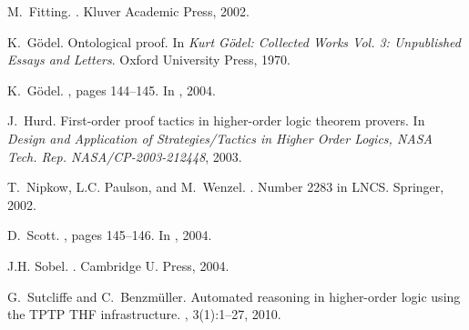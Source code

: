 \documentclass{easychair}
\begin{document}
\begin{thebibliography}{10}
M.~Fitting.
.
\newblock Kluver Academic Press, 2002.

K.~G\"odel.
\newblock Ontological proof.
\newblock In {\em {Kurt G\"odel: Collected Works Vol. 3: Unpublished Essays and
  Letters}}. Oxford University Press, 1970.

K.~G\"odel.
, pages 144--145.
\newblock In  \cite{sobel2004logic}, 2004.


J.~Hurd.
\newblock First-order proof tactics in higher-order logic theorem provers.
\newblock In {\em Design and Application of Strategies/Tactics in Higher Order
  Logics, NASA Tech. Rep. NASA/CP-2003-212448}, 2003.

T.~Nipkow, L.C. Paulson, and M.~Wenzel.
.
\newblock Number 2283 in LNCS. Springer, 2002.


D.~Scott.
, pages 145--146.
\newblock In  \cite{sobel2004logic}, 2004.

J.H. Sobel.
.
\newblock Cambridge U. Press, 2004.

G.~Sutcliffe and C.~Benzm{\"u}ller.
\newblock Automated reasoning in higher-order logic using the {TPTP THF}
  infrastructure.
, 3(1):1--27, 2010.

\end{thebibliography}
\end{document}
